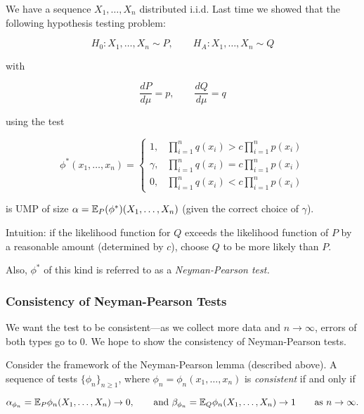 \begin{theorem}

We have a sequence \(X_1, \ldots, X_n\) distributed i.i.d. Last time we showed that the following hypothesis testing problem:

\[
H_0: X_1, \ldots, X_n \sim P, \qquad H_A: X_1, \ldots, X_n \sim Q
\]

with

\[
\frac{dP}{d\mu} = p, \qquad \frac{dQ}{d\mu} = q
\]

using the test

\begin{equation}\label{mathstats.np.test.def}
\phi^* (x_1, \ldots, x_n) = \begin{cases}
1, &  \prod_{i=1}^n q(x_i) > c \prod_{i=1}^n p(x_i) \\
\gamma ,&   \prod_{i=1}^n q(x_i) =  c \prod_{i=1}^n p(x_i)  \\
0, &  \prod_{i=1}^n q(x_i) <  c \prod_{i=1}^n p(x_i) 
\end{cases}
\end{equation}

is UMP of size \(\alpha = \E_P(\phi^*)(X_1, \ldots, X_n)\) (given the correct choice of \(\gamma\)).

\end{theorem}

\begin{remark}

Intuition: if the likelihood function for \(Q\) exceeds the likelihood function of \(P\) by a reasonable amount (determined by \(c\)), choose \(Q\) to be more likely than \(P\).

Also, \(\phi^*\) of this kind is referred to as a \textit{Neyman-Pearson test.}

\end{remark}

\subsubsection{Consistency of Neyman-Pearson Tests}

We want the test to be consistent---as we collect more data and \(n \to \infty\), errors of both types go to 0. We hope to show the consistency of Neyman-Pearson tests.

\begin{definition}

Consider the framework of the Neyman-Pearson lemma (described above). A sequence of tests \(\{\phi_n\}_{n \geq 1}\), where \(\phi_n = \phi_n(x_1, \ldots, x_n)\) is \textit{consistent} if and only if

\[
\alpha_{\phi_n} = \E_P \phi_n(X_1, \ldots, X_n) \to 0, \qquad \text{and } \beta_{\phi_n} = \E_Q \phi_n(X_1, \ldots, X_n) \to 1 \qquad \text{as } n \to \infty.
\]

\end{definition}

